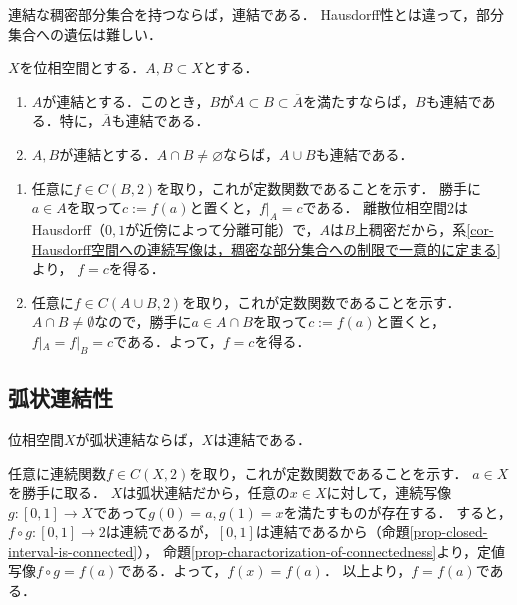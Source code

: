 \documentclass[uplatex,dvipdfmx]{jsreport}
\begin{document}
\begin{tcolorbox}[colframe=ForestGreen, colback=ForestGreen!10!white,breakable,colbacktitle=ForestGreen!40!white,coltitle=black,fonttitle=\bfseries\sffamily,
title=]
    連結な稠密部分集合を持つならば，連結である．
    Hausdorff性とは違って，部分集合への遺伝は難しい．
\end{tcolorbox}

\begin{corollary}[連結性の伝播]\label{cor-connectedness-over-union}
    $X$を位相空間とする．$A,B\subset X$とする．
    \begin{enumerate}
        \item $A$が連結とする．このとき，$B$が$A\subset B\subset\overline{A}$を満たすならば，$B$も連結である．特に，$\overline{A}$も連結である．
        \item $A,B$が連結とする．$A\cap B\ne\varnothing$ならば，$A\cup B$も連結である．
    \end{enumerate}
\end{corollary}
\begin{Proof}\mbox{}
    \begin{enumerate}
        \item 任意に$f\in C(B,2)$を取り，これが定数関数であることを示す．
        勝手に$a\in A$を取って$c:=f(a)$と置くと，$f|_A=c$である．
        離散位相空間$2$はHausdorff（$0,1$が近傍によって分離可能）で，$A$は$B$上稠密だから，系\ref{cor-Hausdorff空間への連続写像は，稠密な部分集合への制限で一意的に定まる}より，
        $f=c$を得る．
        \item 任意に$f\in C(A\cup B,2)$を取り，これが定数関数であることを示す．
        $A\cap B\ne\emptyset$なので，勝手に$a\in A\cap B$を取って$c:=f(a)$と置くと，$f|_A=f|_B=c$である．よって，$f=c$を得る．
    \end{enumerate}
\end{Proof}

\subsection{弧状連結性}

\begin{corollary}[弧状連結ならば連結]
    位相空間$X$が弧状連結ならば，$X$は連結である．
\end{corollary}
\begin{Proof}
    任意に連続関数$f\in C(X,2)$を取り，これが定数関数であることを示す．
    $a\in X$を勝手に取る．
    $X$は弧状連結だから，任意の$x\in X$に対して，連続写像$g:[0,1]\to X$であって$g(0)=a,g(1)=x$を満たすものが存在する．
    すると，$f\circ g:[0,1]\to 2$は連続であるが，$[0,1]$は連結であるから（命題\ref{prop-closed-interval-is-connected}），
    命題\ref{prop-charactorization-of-connectedness}より，定値写像$f\circ g=f(a)$である．よって，$f(x)=f(a)$．
    以上より，$f=f(a)$である．
\end{Proof}
\end{document}
